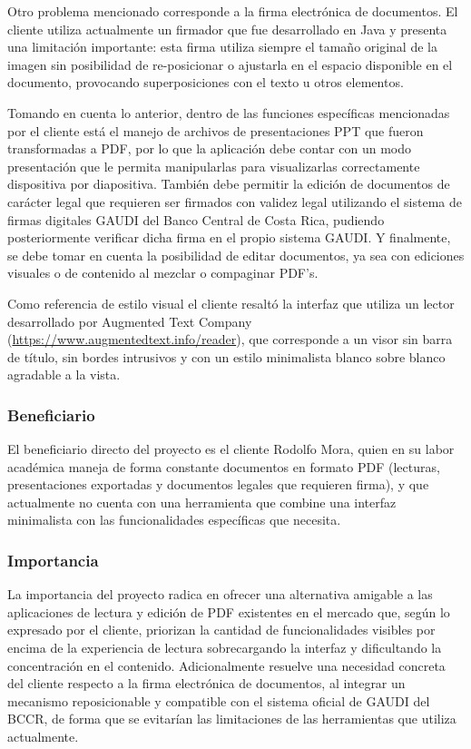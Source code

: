 Otro problema mencionado corresponde a la firma electrónica de documentos. El cliente utiliza actualmente un firmador que fue desarrollado en Java y presenta una limitación importante: esta firma utiliza siempre el tamaño original de la imagen sin posibilidad de re-posicionar o ajustarla en el espacio disponible en el documento, provocando superposiciones con el texto u otros elementos.

Tomando en cuenta lo anterior, dentro de las funciones específicas mencionadas por el cliente está el manejo de archivos de presentaciones PPT que fueron transformadas a PDF, por lo que la aplicación debe contar con un modo presentación que le permita manipularlas para visualizarlas correctamente dispositiva por diapositiva. También debe permitir la edición de documentos de carácter legal que requieren ser firmados con validez legal utilizando el sistema de firmas digitales GAUDI del Banco Central de Costa Rica, pudiendo posteriormente verificar dicha firma en el propio sistema GAUDI. Y finalmente, se debe tomar en cuenta la posibilidad de editar documentos, ya sea con ediciones visuales o de contenido al mezclar o compaginar PDF's.

Como referencia de estilo visual el cliente resaltó la interfaz que utiliza un lector desarrollado por Augmented Text Company (\url{https://www.augmentedtext.info/reader}), que corresponde a un visor sin barra de título, sin bordes intrusivos y con un estilo minimalista blanco sobre blanco agradable a la vista.

\subsubsection{Beneficiario}
El beneficiario directo del proyecto es el cliente Rodolfo Mora, quien en su labor académica maneja de forma constante documentos en formato PDF (lecturas, presentaciones exportadas y documentos legales que requieren firma), y que actualmente no cuenta con una herramienta
que combine una interfaz minimalista con las funcionalidades específicas que necesita.

\subsubsection{Importancia}
La importancia del proyecto radica en ofrecer una alternativa amigable a las aplicaciones de lectura y edición de PDF existentes en el mercado que, según lo expresado por el cliente, priorizan la cantidad de funcionalidades visibles por encima de la experiencia de lectura sobrecargando la interfaz y dificultando la concentración en el contenido. Adicionalmente resuelve una necesidad concreta del cliente respecto a la firma electrónica de documentos, al integrar un mecanismo reposicionable y compatible con el sistema oficial de GAUDI del BCCR, de forma que se evitarían las limitaciones de las herramientas que utiliza actualmente.

